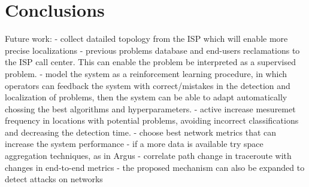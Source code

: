 \chapter{Conclusions}


Future work:
- collect datailed topology from the ISP which will enable more precise
localizations
- previous problems database and end-users reclamations to the ISP call center.
This can enable the problem be interpreted as a supervised problem.
- model the system as a reinforcement learning procedure, in which operators
can feedback the system with correct/mistakes in the detection and localization
of problems, then the system can be able to adapt automatically chossing the
best algorithms and hyperparameters.
- active increase mesuremet frequency in locations with potential problems,
avoiding incorrect classifications and decreasing the detection time.
- choose best network metrics that can increase the system performance
- if a more data is available try space aggregation techniques, as in Argus
- correlate path change in traceroute with changes in end-to-end metrics
- the proposed mechanism can also be expanded to detect attacks on networks
